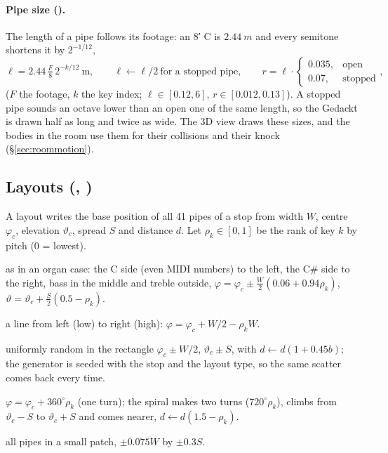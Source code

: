 \paragraph{Pipe size ().} The length of a pipe follows its footage: an 8′ C is
$\SI{2.44}{m}$ and every semitone shortens it by $2^{-1/12}$,
\begin{equation}
  \ell = 2.44\,\tfrac{F}{8}\,2^{-k/12}\ \text{m},\qquad \ell \leftarrow \ell/2\ \text{for a stopped pipe},\qquad
  r = \ell\cdot\begin{cases}0.035,&\text{open}\\0.07,&\text{stopped}\end{cases},
\end{equation}
($F$ the footage, $k$ the key index; $\ell\in[0.12,6]$, $r\in[0.012,0.13]$). A stopped pipe sounds an octave lower
than an open one of the same length, so the Gedackt is drawn half as long and twice as wide. The 3D view draws
these sizes, and the bodies in the room use them for their collisions and their knock (\S\ref{sec:roommotion}).

\subsection{Layouts (, )}
\label{sec:math-layouts}
A layout writes the base position of all 41 pipes of a stop from width $W$, centre $\varphi_c$, elevation
$\vartheta_c$, spread $S$ and distance $d$. Let $\rho_k\in[0,1]$ be the rank of key $k$ by pitch ($0$ = lowest).
\begin{description}[style=nextline]
  \item[Gehäuse C/C\#] as in an organ case: the C side (even MIDI numbers) to the left, the C\# side to the right,
    bass in the middle and treble outside, $\varphi = \varphi_c \pm \tfrac{W}{2}(0.06+0.94\rho_k)$,
    $\vartheta = \vartheta_c + \tfrac{S}{2}(0.5-\rho_k)$.
  \item[Tonhöhe] a line from left (low) to right (high): $\varphi = \varphi_c + W/2 - \rho_k W$.
  \item[Streuung] uniformly random in the rectangle $\varphi_c\pm W/2$, $\vartheta_c\pm S$, with
    $d \leftarrow d(1+0.45b)$; the generator is seeded with the stop and the layout type, so the same scatter comes
    back every time.
  \item[Ring, Spirale] $\varphi = \varphi_c + 360^\circ\rho_k$ (one turn); the spiral makes two turns
    ($720^\circ\rho_k$), climbs from $\vartheta_c-S$ to $\vartheta_c+S$ and comes nearer, $d\leftarrow d(1.5-\rho_k)$.
  \item[Zone] all pipes in a small patch, $\pm0.075W$ by $\pm 0.3S$.
\end{description}

